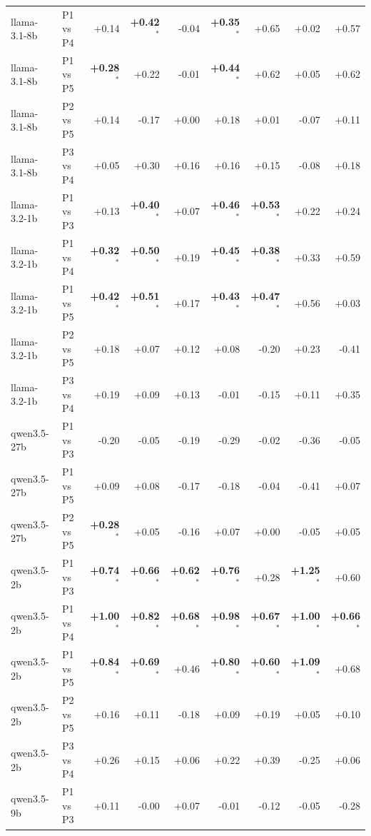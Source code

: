 \begin{table}[p]
\begin{tabular}{llrrrrrrr}
llama-3.1-8b & P1 vs P4 & +0.14 & \textbf{+0.42$^{*}$} & -0.04 & \textbf{+0.35$^{*}$} & +0.65 & +0.02 & +0.57 \\
llama-3.1-8b & P1 vs P5 & \textbf{+0.28$^{*}$} & +0.22 & -0.01 & \textbf{+0.44$^{*}$} & +0.62 & +0.05 & +0.62 \\
llama-3.1-8b & P2 vs P5 & +0.14 & -0.17 & +0.00 & +0.18 & +0.01 & -0.07 & +0.11 \\
llama-3.1-8b & P3 vs P4 & +0.05 & +0.30 & +0.16 & +0.16 & +0.15 & -0.08 & +0.18 \\
llama-3.2-1b & P1 vs P3 & +0.13 & \textbf{+0.40$^{*}$} & +0.07 & \textbf{+0.46$^{*}$} & \textbf{+0.53$^{*}$} & +0.22 & +0.24 \\
llama-3.2-1b & P1 vs P4 & \textbf{+0.32$^{*}$} & \textbf{+0.50$^{*}$} & +0.19 & \textbf{+0.45$^{*}$} & \textbf{+0.38$^{*}$} & +0.33 & +0.59 \\
llama-3.2-1b & P1 vs P5 & \textbf{+0.42$^{*}$} & \textbf{+0.51$^{*}$} & +0.17 & \textbf{+0.43$^{*}$} & \textbf{+0.47$^{*}$} & +0.56 & +0.03 \\
llama-3.2-1b & P2 vs P5 & +0.18 & +0.07 & +0.12 & +0.08 & -0.20 & +0.23 & -0.41 \\
llama-3.2-1b & P3 vs P4 & +0.19 & +0.09 & +0.13 & -0.01 & -0.15 & +0.11 & +0.35 \\
qwen3.5-27b & P1 vs P3 & -0.20 & -0.05 & -0.19 & -0.29 & -0.02 & -0.36 & -0.05 \\
qwen3.5-27b & P1 vs P5 & +0.09 & +0.08 & -0.17 & -0.18 & -0.04 & -0.41 & +0.07 \\
qwen3.5-27b & P2 vs P5 & \textbf{+0.28$^{*}$} & +0.05 & -0.16 & +0.07 & +0.00 & -0.05 & +0.05 \\
qwen3.5-2b & P1 vs P3 & \textbf{+0.74$^{*}$} & \textbf{+0.66$^{*}$} & \textbf{+0.62$^{*}$} & \textbf{+0.76$^{*}$} & +0.28 & \textbf{+1.25$^{*}$} & +0.60 \\
qwen3.5-2b & P1 vs P4 & \textbf{+1.00$^{*}$} & \textbf{+0.82$^{*}$} & \textbf{+0.68$^{*}$} & \textbf{+0.98$^{*}$} & \textbf{+0.67$^{*}$} & \textbf{+1.00$^{*}$} & \textbf{+0.66$^{*}$} \\
qwen3.5-2b & P1 vs P5 & \textbf{+0.84$^{*}$} & \textbf{+0.69$^{*}$} & +0.46 & \textbf{+0.80$^{*}$} & \textbf{+0.60$^{*}$} & \textbf{+1.09$^{*}$} & +0.68 \\
qwen3.5-2b & P2 vs P5 & +0.16 & +0.11 & -0.18 & +0.09 & +0.19 & +0.05 & +0.10 \\
qwen3.5-2b & P3 vs P4 & +0.26 & +0.15 & +0.06 & +0.22 & +0.39 & -0.25 & +0.06 \\
qwen3.5-9b & P1 vs P3 & +0.11 & -0.00 & +0.07 & -0.01 & -0.12 & -0.05 & -0.28 \\

\end{tabular}
\end{table}
